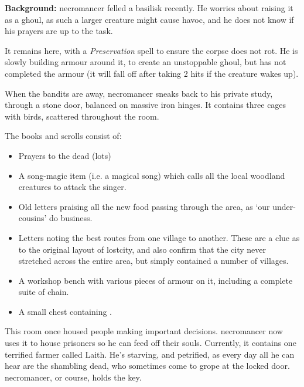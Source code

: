 
\textbf{Background:}
\Gls{necromancer} felled a basilisk recently.
He worries about raising it as a ghoul, as such a larger creature might cause havoc, and he does not know if his prayers are up to the task.

It remains here, with a \textit{Preservation} spell to ensure the corpse does not rot.
He is slowly building armour around it, to create an unstoppable ghoul, but has not completed the armour (it will fall off after taking 2 hits if the creature wakes up).


When the bandits are away, \gls{necromancer} sneaks back to his private study, through a stone door, balanced on massive iron hinges.
It contains three cages with birds, scattered throughout the room.

The books and scrolls consist of:

\begin{itemize}

  \item
  Prayers to the dead (lots)
  \item
  A song-magic item (i.e. a magical song) which calls all the local woodland creatures to attack the singer.%
  \iftoggle{aif}{\footnote{See \autopageref{medalofheroism}.}}{}
  \item
  Old letters praising all the new food passing through the area, as `our under-cousins' do business.
  \item
  Letters noting the best routes from one village to another.
  These are a clue as to the original layout of \gls{lostcity}, and also confirm that the city never stretched across the entire area, but simply contained a number of \glspl{village}.
  \item
  A workshop bench with various pieces of armour on it, including a complete suite of chain.
  \item
  A small chest containing \lootMedium.

\end{itemize}


This room once housed people making important decisions.  \Gls{necromancer} now uses it to house prisoners so he can feed off their souls.
Currently, it contains one terrified farmer called Laith.
He's starving, and petrified, as every day all he can hear are the shambling dead, who sometimes come to grope at the locked door.
\Gls{necromancer}, or course, holds the key.

